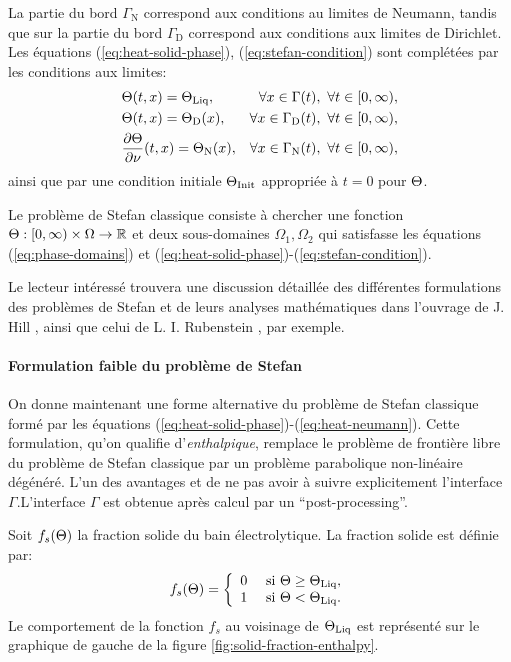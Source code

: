 La partie du bord $\Gamma_\mathrm{N}$ correspond aux conditions au
limites de Neumann, tandis que sur la partie du bord
$\Gamma_\mathrm{D}$ correspond aux conditions aux limites de
Dirichlet. Les équations (\ref{eq:heat-solid-phase}),
(\ref{eq:stefan-condition}) sont complétées par les conditions aux
limites:
\begin{align}
  &\temperature(t, x) = \tliq, %
  &\forall x \in \Gamma(t),\ \forall t \in [0,\infty),\label{eq:heat-transition}\\
  &\temperature(t, x) = \temperature_\mathrm{D}(x), %
  &\forall x \in \Gamma_\mathrm{D}(t),\ \forall t \in [0,\infty),\label{eq:heat-dirichlet}\\
  &\frac{\partial \temperature}{\partial \nu}(t, x) = \temperature_\mathrm{N}(x), %
  &\forall x \in \Gamma_\mathrm{N}(t),\ \forall t \in [0,\infty),\label{eq:heat-neumann}
\end{align}
ainsi que par une condition initiale $\Theta_\text{Init}$ appropriée à $t = 0$ pour
$\Theta$.

Le problème de Stefan classique consiste à chercher une fonction
$\Theta:[0,\infty)\times\Omega\to\mathbb R$ et deux
  sous-domaines $\Omega_1,\Omega_2$ qui satisfasse les équations
  (\ref{eq:phase-domains}) et
  (\ref{eq:heat-solid-phase})-(\ref{eq:stefan-condition}).

Le lecteur intéressé trouvera une discussion détaillée des différentes
formulations des problèmes de Stefan et de leurs analyses
mathématiques dans l'ouvrage de J. Hill \cite{HillStefanProblems},
ainsi que celui de L. I. Rubenstein \cite{Rubenstein1971}, par
exemple.

\paragraph{Formulation faible du problème de Stefan}
On donne maintenant une forme alternative du problème de Stefan
classique formé par les équations
(\ref{eq:heat-solid-phase})-(\ref{eq:heat-neumann}). Cette
formulation, qu'on qualifie d'{\em enthalpique},
remplace le problème de frontière libre du problème de Stefan
classique par un problème parabolique non-linéaire dégénéré. L'un des
avantages et de ne pas avoir à suivre explicitement l'interface
$\Gamma$.L'interface $\Gamma$ est obtenue après calcul par un
``post-processing''.

Soit $f_s(\Theta)$ la fraction solide du bain électrolytique. La
fraction solide est définie par:
\begin{equation}
  f_s(\Theta) = \left\{
  \begin{array}{ll}
    0           & \text{ si } \Theta \geq \Theta_\text{Liq},\\
    1           & \text{ si } \Theta < \Theta_\text{Liq}.
  \end{array}
  \right.
\end{equation}
Le comportement de la fonction $f_s$ au voisinage de $\Theta_\text{Liq}$ est
représenté sur le graphique de gauche de la figure
\ref{fig:solid-fraction-enthalpy}.

